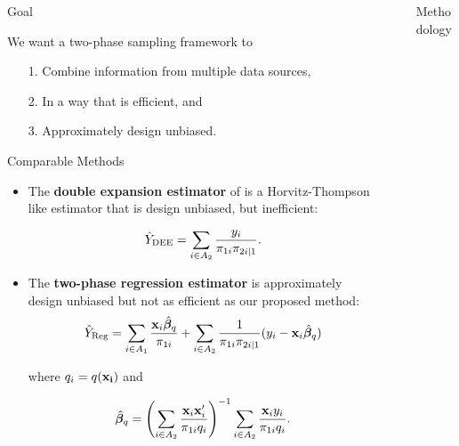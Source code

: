 \documentclass[final]{beamer}
\newlength{\sepwidth}
\newlength{\colwidth}
\newcommand{\separatorcolumn}{\begin{column}{\sepwidth}\end{column}}
\begin{document}
\begin{frame}[t]
\begin{columns}[t]
\begin{column}{\colwidth}
  \begin{block}{Goal}

    We want a two-phase sampling framework to

    \begin{itemize}
      \item[1.] Combine information from multiple data sources,
      \item[2.] In a way that is efficient, and
      \item[3.] Approximately design unbiased.
    \end{itemize}

  \end{block}

  \begin{block}{Comparable Methods}

    \begin{itemize}
      \item The \textbf{double expansion estimator} of \cite{kott1997can}
        is a Horvitz-Thompson like estimator that is design unbiased, but
        inefficient:

        $$
        \hat Y_{\rm{DEE}} = \sum_{i \in A_2} \frac{y_i}{\pi_{1i}\pi_{2i|1}}.
        $$
      \item The \textbf{two-phase regression estimator} is approximately design
        unbiased but not as efficient as our proposed method:
        $$
        \hat Y_{\rm{Reg}} = 
        \sum_{i \in A_1} \frac{{\bf{x}}_i \hat{\bm{\beta}}_q}{\pi_{1i}} + 
        \sum_{i \in A_2} \frac{1}{\pi_{1i}\pi_{2i|1}}(y_i - 
        {\bf{x}}_i \hat{\bm{\beta}}_q)
        $$

        where $q_i = q(\bf x_i)$ and 

        $$
        \hat{\bm \beta}_q = \left(\sum_{i \in A_2} 
        \frac{{\bf{x}}_i {\bf{x}}_i'}{\pi_{1i} q_i}\right)^{-1} 
        \sum_{i \in A_2} \frac{{\bf{x}}_i y_i}{\pi_{1i} q_i}.
        $$

    \end{itemize}

  \end{block}

\end{column}

\separatorcolumn

\begin{column}{\colwidth}

  \begin{block}{Methodology}


\end{block}
\end{column}
\end{columns}
\end{frame}
\end{document}
